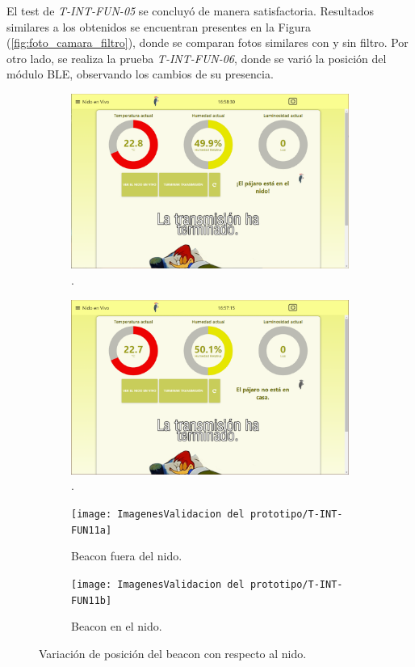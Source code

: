 El test de \textit{T-INT-FUN-05} se concluyó de manera satisfactoria. Resultados similares a los obtenidos se encuentran presentes en la Figura (\ref{fig:foto_camara_filtro}), donde se comparan fotos similares con y sin filtro. Por otro lado, se realiza la prueba \textit{T-INT-FUN-06}, donde se varió la posición del módulo BLE, observando los cambios de su presencia.
\begin{figure}[H]
	\centering
		\begin{subfigure}{0.49\textwidth}
			\centering
			\includegraphics[width=\linewidth]{ImagenesValidacion del prototipo/T-INT-FUN-6-1}		
			\caption{.}
		\end{subfigure}\hfill
		\begin{subfigure}{0.49\textwidth}
			\centering
			\includegraphics[width=\linewidth]{ImagenesValidacion del prototipo/T-INT-FUN-6-2}
			\caption{.}
		\end{subfigure}		
		
		\begin{subfigure}{0.49\textwidth}
			\centering
			\texttt{[image: ImagenesValidacion del prototipo/T-INT-FUN11a]}	
			\caption{Beacon fuera del nido.}
		\end{subfigure}\hfill
		\begin{subfigure}{0.49\textwidth}
			\centering
			\texttt{[image: ImagenesValidacion del prototipo/T-INT-FUN11b]}
		\caption{Beacon en el nido.}
		\end{subfigure}
	\caption{Variación de posición del beacon con respecto al nido.}
\end{figure}

